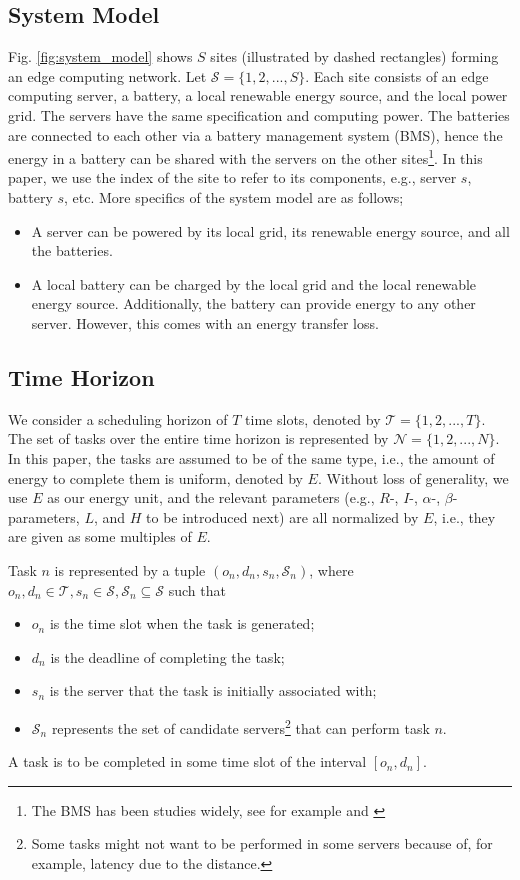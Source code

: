 \documentclass[conference, 10pt, ﬁnal, letterpaper, twocolumn]{IEEEtran}
\begin{document}
\subsection{System Model}
Fig. \ref{fig:system_model} shows $S$ sites (illustrated by dashed rectangles) forming an edge computing network. Let $\mathcal{S} = \{1,2,...,S\}$. Each site consists of an edge computing server, a battery, a local renewable energy source, and the local power grid. The servers have the same specification and computing power. The batteries are connected to each other via a battery management system (BMS), hence the energy in a battery can be shared with the servers on the other sites\footnote{The BMS has been studies widely, see for example \cite{leithon2013online} and \cite{leithon2019task}}. In this paper, we use the index of the site to refer to its components, e.g., server $s$, battery $s$, etc. More specifics of the system model are as follows;
\begin{itemize}
    \item A server can be powered by its local grid, its renewable energy source, and all the batteries. 
    \item A local battery can be charged by the local grid and the local renewable energy source. Additionally, the battery can provide energy to any other server. However, this comes with an energy transfer loss.
\end{itemize}

\subsection{Time Horizon}
We consider a scheduling horizon of $T$ time slots, denoted by $\mathcal{T} = \{1,2,...,T\}$. The set of tasks over the entire time horizon is represented by $\mathcal{N} = \{1, 2, ..., N\}$. In this paper, the tasks are assumed to be of the same type, i.e., the amount of energy to complete them is uniform, denoted by $E$. Without loss of generality, we use $E$ as our energy unit, and the relevant parameters (e.g., $R$-, $I$-, $\alpha$-, $\beta$-parameters, $L$, and $H$ to be introduced next) are all normalized by $E$, i.e., they are given as some multiples of $E$. 

Task $n$ is represented by a tuple $(o_n, d_n, s_n, \mathcal{S}_n)$, where $o_n, d_n \in \mathcal{T}, s_n \in \mathcal{S}, \mathcal{S}_n \subseteq \mathcal{S}$ such that
\begin{itemize}
    \item $o_n$ is the time slot when the task is generated;
    \item $d_n$ is the deadline of completing the task;
    \item $s_n$ is the server that the task is initially associated with;
    \item $\mathcal{S}_n$ represents the set of candidate servers\footnote{Some tasks might not want to be performed in some servers because of, for example, latency due to the distance.} that can perform task $n$.
\end{itemize}
A task is to be completed in some time slot of the interval $[o_n, d_n]$.
\end{document}

